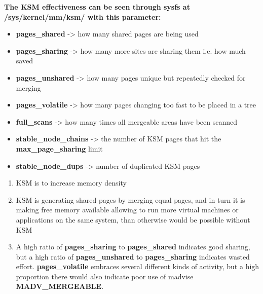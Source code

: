 \vspace{5mm}

\textbf{The KSM effectiveness can be seen through sysfs at /sys/kernel/mm/ksm/ with this parameter:}
\begin{itemize}
\item \textbf{pages\_shared} -> how many shared pages are being used
\item \textbf{pages\_sharing} -> how many more sites are sharing them i.e. how much saved
\item \textbf{pages\_unshared} -> how many pages unique but repeatedly checked for merging
\item \textbf{pages\_volatile} -> how many pages changing too fast to be placed in a tree
\item \textbf{full\_scans} -> how many times all mergeable areas have been scanned
\item \textbf{stable\_node\_chains} -> the number of KSM pages that hit the \textbf{max\_page\_sharing} limit
\item \textbf{stable\_node\_dups} -> number of duplicated KSM pages
\end{itemize}

\vspace{5mm}

\begin{enumerate}
\item KSM is to increase memory density
\item KSM is generating shared pages by merging equal pages, and in turn it is making free memory available allowing to run more virtual machines or applications on the same system, than otherwise would be possible without KSM
\item A high ratio of \textbf{pages\_sharing} to \textbf{pages\_shared} indicates good sharing, but a high ratio of \textbf{pages\_unshared} to \textbf{pages\_sharing} indicates wasted effort. \textbf{pages\_volatile} embraces several different kinds of activity, but a high proportion there would also indicate poor use of madvise \textbf{MADV\_MERGEABLE}.
\end{enumerate}